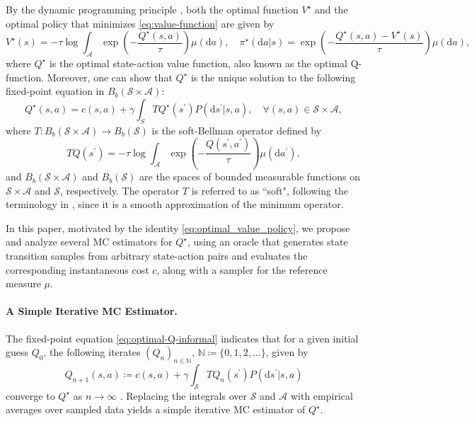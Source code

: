 \documentclass[11pt]{article}
\numberwithin{equation}{section}
\theoremstyle{definition}
\theoremstyle{remark}
\def\cA{\mathcal{A}}
\def\cS{\mathcal{S}}
\def\diff{{\mathrm{d}}}
\def\N{{\mathbb{N}}}
\newcommand{\citep}{\cite}
\newcommand{\citet}{\cite}
\begin{document}
By the dynamic programming principle  \citep[Appendix B]{kerimkulov2023fisherrao}, both the optimal  function $V^\star$ 
  and the optimal policy that minimizes \eqref{eq:value-function} are 
 given by 
 \begin{equation}
 \label{eq:optimal_value_policy}
        V ^{\star}(s) = - \tau \log \int_{\mathcal A} \exp \left( - \frac{Q ^{\star}(s,a)}{\tau}  \right) \mu (\diff a),
        \quad
        \pi^{\star}  (\diff a|s) = \exp\left(-\frac{ Q^{\star} (s,a)-V^{\star} (s)}{ \tau}\right)\mu(\diff a),
\end{equation}
  where   $Q^\star$ is the 
  optimal state-action value function, also known as the optimal Q-function.
  Moreover,
  one can show that $Q^\star$ is the 
  unique   solution to the following fixed-point equation in $B_b(\cS\times \cA)$:
      \begin{equation}
        \label{eq:optimal-Q-informal}
        Q ^{\star}(s,a)= c(s,a) + \gamma \int_{S} TQ ^{\star}(s ^{\prime}) P(\diff s ^{\prime} | s,a), \quad \forall (s,a)\in \cS\times \cA,
    \end{equation}
    where $T:B_b(\cS\times   \cA)\to B_b(\cS)$ is the soft-Bellman operator defined by
  \begin{equation}
    \label{eq:T-operator-def}
    TQ (s^\prime) =  -\tau \log \int_{\mathcal A} \exp \left( - \frac{Q(s^\prime, a^\prime)}{\tau}   \right) \mu (\diff a^\prime),
\end{equation}
  and $B_b(\cS\times \cA)$
  and $B_b(\cS )$ are the spaces of   bounded measurable functions on $\cS\times \cA$ and $\cS$, respectively. 
  The operator $T$
  is referred to as ``soft",
  following the terminology in  
\citet{van2019composing}, since it is a smooth approximation of the minimum operator. 


In this paper,
motivated by the 
  identity \eqref{eq:optimal_value_policy}, we propose and analyze several MC estimators for  $ Q^\star $, using an oracle that generates state transition samples 
  from arbitrary state-action pairs
  and evaluates the corresponding   instantaneous  cost $c$, along with a sampler for the reference measure $ \mu $.  


  \paragraph{A Simple Iterative MC Estimator.}

The fixed-point equation 
\eqref{eq:optimal-Q-informal} indicates that for a given initial guess   $Q_0$, 
the following iterates 
$(Q_n)_{n\in \N}$,
$\N\coloneqq  \{0,1,2, \ldots\}$,
given by  
\begin{equation}
    \label{eq:recursion-Q}
    Q_{n+1} (s,a) \coloneqq  c(s,a) + \gamma \int_{\mathcal S} TQ_n (s^\prime)  P(\diff s^\prime | s, a)
\end{equation}
converge  to $Q^\star$ as $n\to \infty$
\citep{kerimkulov2023fisherrao}. Replacing the integrals over $\cS$
 and $\cA$ with empirical averages over sampled data yields   a simple iterative MC estimator of $Q^\star$.
 
\end{document}
